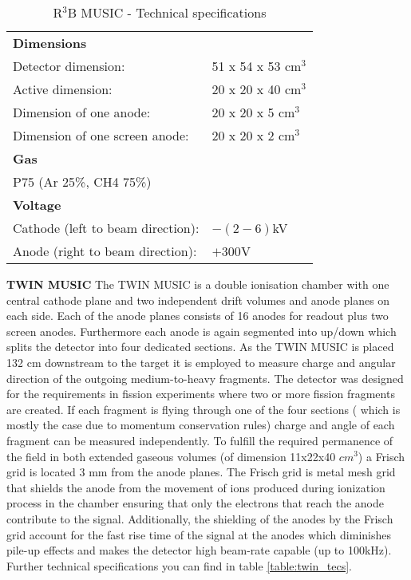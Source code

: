 \begin{table}[h!]
    \centering
    \begin{tabular}{ll}
        \hline
        \textbf{Dimensions} & \\ 
	Detector dimension: & 51 x 54 x 53 cm$^3$ \\ 
	Active dimension: & 20 x 20 x 40 cm$^3$\\
	Dimension of one anode:& 20 x 20 x 5 cm$^3$\\
	Dimension of one screen anode:& 20 x 20 x 2 cm$^3$\\
	\textbf{Gas} &\\
	P75 (Ar 25\%, CH4 75\%) \\
	\textbf{Voltage} & \\
	Cathode (left to beam direction): &  $-(2-6)$kV \\
	Anode (right to beam direction): & $+300$V \\
	\hline
    \end{tabular}
    \caption{R$^3$B MUSIC - Technical specifications}
	\label{table:r3bmusic_tecs}
\end{table}
\newline
\textbf{TWIN MUSIC}\newline
The TWIN MUSIC is a double ionisation chamber with one central cathode plane and two independent drift volumes and anode planes on each side. Each of the anode planes consists of 16 anodes for readout plus two screen anodes. Furthermore each anode is again segmented into up/down which splits the detector into four dedicated sections. As the TWIN MUSIC is placed 132 cm downstream to the target it is employed to measure charge and angular direction of the outgoing medium-to-heavy fragments. The detector was designed for the requirements in fission experiments where two or more fission fragments are created. If each fragment is flying through one of the four sections ( which is mostly the case due to momentum conservation rules) charge and angle of each fragment can be measured independently.\newline
To fulfill the required permanence of the field in both extended gaseous volumes (of dimension 11x22x40 $cm^3$) a Frisch grid is located 3 mm from the anode planes. The Frisch grid is metal mesh grid that shields the anode from the movement of ions produced during ionization process in the chamber ensuring that only the electrons that reach the anode contribute to the signal. Additionally, the shielding of the anodes by the Frisch grid account for the fast rise time of the signal at the anodes which diminishes pile-up effects and makes the detector high beam-rate capable (up to 100kHz). Further technical specifications you can find in table \ref{table:twin_tecs}.
